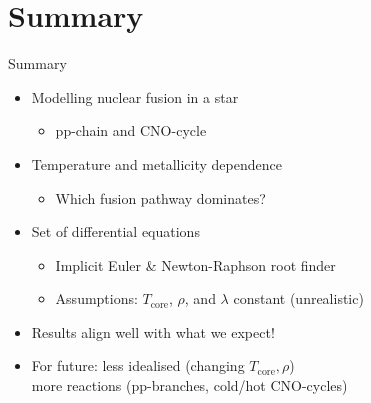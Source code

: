 \section{Summary}
\begin{frame}{Summary}
\begin{itemize}
    \item Modelling nuclear fusion in a star \begin{itemize}
        \item pp-chain and CNO-cycle
    \end{itemize}
    \item Temperature and metallicity dependence
    \begin{itemize}
        \item Which fusion pathway dominates?
    \end{itemize}
    \item Set of differential equations
    \begin{itemize}
        \item Implicit Euler \& Newton-Raphson root finder
        \item Assumptions: $T_\mathrm{core}$, $\rho$, and $\lambda$ constant (unrealistic)
    \end{itemize}
    \item Results align well with what we expect!
    \item For future: less idealised (changing $T_\mathrm{core}, \rho$)\\\phantom{For future:} more reactions (pp-branches, cold/hot CNO-cycles)
\end{itemize}
    
\end{frame}